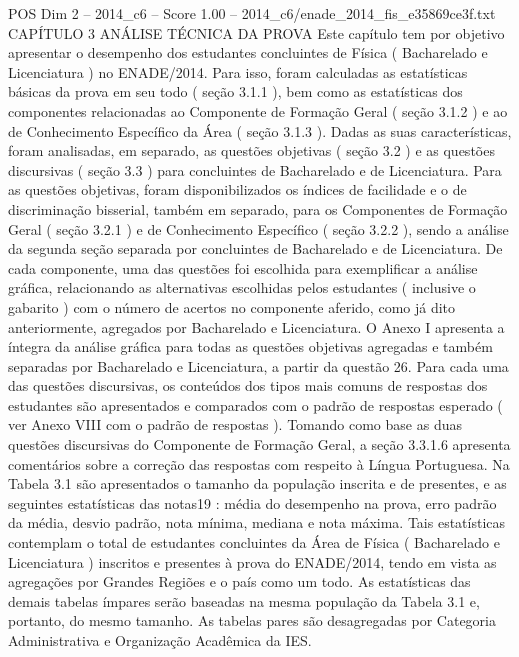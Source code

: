 \begin{textsample}{POS Dim 2 – 2014\_c6 – Score 1.00 – 2014\_c6/enade\_2014\_fis\_e35869ce3f.txt}  \label{ex:f2_pos_230}
CAPÍTULO 3 ANÁLISE TÉCNICA DA PROVA Este capítulo tem por objetivo apresentar o desempenho dos estudantes concluintes de Física ( Bacharelado e Licenciatura ) no ENADE/2014.
Para isso, foram calculadas as estatísticas básicas da prova em seu todo ( seção 3.1.1 ), bem como as estatísticas dos componentes relacionadas ao Componente de Formação Geral ( seção 3.1.2 ) e ao de Conhecimento Específico da Área ( seção 3.1.3 ).
Dadas as suas características, foram analisadas, em separado, as questões objetivas ( seção 3.2 ) e as questões discursivas ( seção 3.3 ) para concluintes de Bacharelado e de Licenciatura.
Para as questões objetivas, foram disponibilizados os índices de facilidade e o de discriminação bisserial, também em separado, para os Componentes de Formação Geral ( seção 3.2.1 ) e de Conhecimento Específico ( seção 3.2.2 ), sendo a análise da segunda seção separada por concluintes de Bacharelado e de Licenciatura.
De cada componente, uma das questões foi escolhida para exemplificar a análise gráfica, relacionando as alternativas escolhidas pelos estudantes ( inclusive o gabarito ) com o número de acertos no componente aferido, como já dito anteriormente, agregados por Bacharelado e Licenciatura.
O Anexo I apresenta a íntegra da análise gráfica para todas as questões objetivas agregadas e também separadas por Bacharelado e Licenciatura, a partir da questão 26.
Para cada uma das questões discursivas, os conteúdos dos tipos mais comuns de respostas dos estudantes são apresentados e comparados com o padrão de respostas esperado ( ver Anexo VIII com o padrão de respostas ).
Tomando como base as duas questões discursivas do Componente de Formação Geral, a seção 3.3.1.6 apresenta comentários sobre a correção das respostas com respeito à Língua Portuguesa.
Na Tabela 3.1 são apresentados o tamanho da população inscrita e de presentes, e as seguintes estatísticas das notas19 : média do desempenho na prova, erro padrão da média, desvio padrão, nota mínima, mediana e nota máxima.
Tais estatísticas contemplam o total de estudantes concluintes da Área de Física ( Bacharelado e Licenciatura ) inscritos e presentes à prova do ENADE/2014, tendo em vista as agregações por Grandes Regiões e o país como um todo.
As estatísticas das demais tabelas ímpares serão baseadas na mesma população da Tabela 3.1 e, portanto, do mesmo tamanho.
As tabelas pares são desagregadas por Categoria Administrativa e Organização Acadêmica da IES.

\end{textsample}
